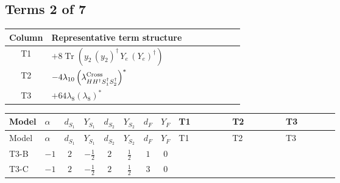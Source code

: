 \documentclass[8pt]{article}
\begin{document}
\begin{landscape}
\subsection*{Terms 2 of 7}
\begin{center}
\begin{tabular}{@{}c >{\raggedright\arraybackslash}p{0.82\linewidth}@{}}
\toprule
Column & Representative term structure \\
\midrule
T1 & \(\displaystyle +8 \operatorname{Tr}\!\left({y_2}\,\left({y_2}\right)^{\dagger}\,{Y_e}\,\left({Y_e}\right)^{\dagger}\right)\) \\
\midrule
T2 & \(\displaystyle -4 {\lambda_{10}} \left({\lambda_{H H^\dagger S_1^\dagger S_2^\dagger}^{\rm Cross}}\right)^{*}\) \\
\midrule
T3 & \(\displaystyle +64 {\lambda_8} \left({\lambda_8}\right)^{*}\) \\
\midrule
\bottomrule
\end{tabular}
\end{center}
\smallskip
\tiny
\begin{longtable}{@{}llcccccc >{\raggedright\arraybackslash}p{0.21\linewidth} >{\raggedright\arraybackslash}p{0.21\linewidth} >{\raggedright\arraybackslash}p{0.21\linewidth}@{}}
\toprule
Model & $\alpha$ & $d_{S_1}$ & $Y_{S_1}$ & $d_{S_2}$ & $Y_{S_2}$ & $d_F$ & $Y_F$ & T1 & T2 & T3 \\
\midrule
\endfirsthead
\toprule
Model & $\alpha$ & $d_{S_1}$ & $Y_{S_1}$ & $d_{S_2}$ & $Y_{S_2}$ & $d_F$ & $Y_F$ & T1 & T2 & T3 \\
\midrule
\endhead
T3-B & $-1$ & $2$ & $-\frac{1}{2}$ & $2$ & $\frac{1}{2}$ & $1$ & $0$ & \scriptsize\adjustbox{max width=\linewidth}{$\begin{gathered} +8 \operatorname{Tr}\!\left({y_2}\,\left({y_2}\right)^{\dagger}\,{Y_e}\,\left({Y_e}\right)^{\dagger}\right)\end{gathered}$} & \scriptsize\adjustbox{max width=\linewidth}{$\begin{gathered} -4 {\lambda_{10}} \left({\lambda_{H H^\dagger S_1^\dagger S_2^\dagger}^{\rm Cross}}\right)^{*}\end{gathered}$} & \scriptsize\adjustbox{max width=\linewidth}{$\begin{gathered} +64 {\lambda_8} \left({\lambda_8}\right)^{*}\end{gathered}$} \\
\midrule
T3-C & $-1$ & $2$ & $-\frac{1}{2}$ & $2$ & $\frac{1}{2}$ & $3$ & $0$ & \scriptsize\adjustbox{max width=\linewidth}{$\begin{gathered} -4 \operatorname{Tr}\!\left({y_2}\,\left({y_2}\right)^{\dagger}\,{Y_e}\,\left({Y_e}\right)^{\dagger}\right)\end{gathered}$} & \scriptsize\adjustbox{max width=\linewidth}{$\begin{gathered} -4 {\lambda_{10}} \left({\lambda_{H H^\dagger S_1^\dagger S_2^\dagger}^{\rm Cross}}\right)^{*}\end{gathered}$} & \scriptsize\adjustbox{max width=\linewidth}{$\begin{gathered} +64 {\lambda_8} \left({\lambda_8}\right)^{*}\end{gathered}$} \\

\end{longtable}
\end{landscape}
\end{document}
